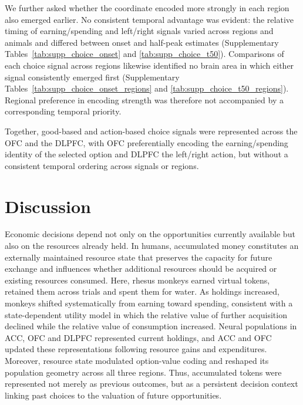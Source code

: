 \documentclass[pdflatex,sn-mathphys-num]{sn-jnl}%
\begin{document}
We further asked whether the coordinate encoded more strongly in each region also emerged earlier. No consistent temporal advantage was evident: the relative timing of earning/spending and left/right signals varied across regions and animals and differed between onset and half-peak estimates (Supplementary Tables~\ref{tab:supp_choice_onset} and \ref{tab:supp_choice_t50}). Comparisons of each choice signal across regions likewise identified no brain area in which either signal consistently emerged first (Supplementary Tables~\ref{tab:supp_choice_onset_regions} and \ref{tab:supp_choice_t50_regions}). Regional preference in encoding strength was therefore not accompanied by a corresponding temporal priority.

Together, good-based and action-based choice signals were represented across the OFC and the DLPFC, with OFC preferentially encoding the earning/spending identity of the selected option and DLPFC the left/right action, but without a consistent temporal ordering across signals or regions.

\section{Discussion}\label{sec3}

Economic decisions depend not only on the opportunities currently available but also on the resources already held. In humans, accumulated money constitutes an externally maintained resource state that preserves the capacity for future exchange and influences whether additional resources should be acquired or existing resources consumed. Here, rhesus monkeys earned virtual tokens, retained them across trials and spent them for water. As holdings increased, monkeys shifted systematically from earning toward spending, consistent with a state-dependent utility model in which the relative value of further acquisition declined while the relative value of consumption increased. Neural populations in ACC, OFC and DLPFC represented current holdings, and ACC and OFC updated these representations following resource gains and expenditures. Moreover, resource state modulated option-value coding and reshaped its population geometry across all three regions. Thus, accumulated tokens were represented not merely as previous outcomes, but as a persistent decision context linking past choices to the valuation of future opportunities.
\end{document}
